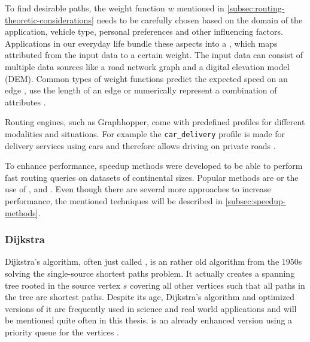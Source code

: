		To find desirable paths, the weight function $w$ mentioned in \cref{subsec:routing-theoretic-considerations} needs to be carefully chosen based on the domain of the application, vehicle type, personal preferences and other influencing factors.
		Applications in our everyday life bundle these aspects into a , which maps attributed from the input data to a certain weight.
		The input data can consist of multiple data sources like a road network graph and a digital elevation model (DEM).
		Common types of weight functions predict the expected speed on an edge \cite{graphhopper-profile-bike-speeds}, use the length of an edge \cite{graphhopper-profile-shortest} or numerically represent a combination of attributes \cite{graphhopper-profile-short-fastest}.
		
		Routing engines, such as Graphhopper, come with predefined profiles for different modalities and situations.
		For example the \texttt{car\_delivery} profile is made for delivery services using cars and therefore allows driving on private roads \cite{graphhopper-routing-profiles}.
		
		To enhance performance, speedup methods were developed to be able to perform fast routing queries on datasets of continental sizes.
		Popular methods are  or the use of ,  and .
		Even though there are several more approaches to increase performance, the mentioned techniques will be described in \cref{subsec:speedup-methods}.
		
		\subsubsection{Dijkstra}
		\label{subsubsec:dijkstra}
		
			Dijkstra's algorithm, often just called , is an rather old algorithm from the 1950s solving the single-source shortest paths problem.
			It actually creates a spanning tree rooted in the source vertex $s$ covering all other vertices such that all paths in the tree are shortest paths.
			Despite its age, Dijkstra's algorithm and optimized versions of it are frequently used in science and real world applications and will be mentioned quite often in this thesis.
			 is an already enhanced version using a priority queue for the vertices \cite[658]{cormen-introduction-to-alg}.
			
